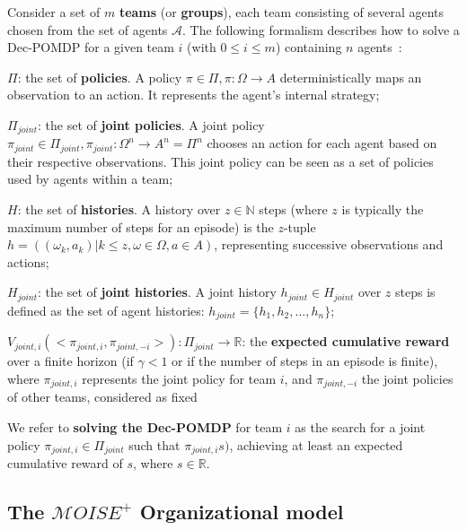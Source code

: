 \documentclass[sigconf,anonymous]{aamas}
\begin{document}
Consider a set of $m$ \textbf{teams} (or \textbf{groups}), each team consisting of several agents chosen from the set of agents $\mathcal{A}$. The following formalism describes how to solve a Dec-POMDP for a given team $i$ (with $0 \leq i \leq m$) containing $n$ agents~\citep{Beynier2013,Albrecht2024}:

\begin{itemize*}[label={},itemjoin={; \quad}]
    \item $\Pi$: the set of \textbf{policies}. A policy $\pi \in \Pi, \pi: \Omega \rightarrow A$ deterministically maps an observation to an action. It represents the agent's internal strategy;
    \item $\Pi_{joint}$: the set of \textbf{joint policies}. A joint policy $\pi_{joint} \in \Pi_{joint}, \pi_{joint}: \Omega^n \rightarrow A^n = \Pi^n$ chooses an action for each agent based on their respective observations. This joint policy can be seen as a set of policies used by agents within a team;
    \item $H$: the set of \textbf{histories}. A history over $z \in \mathbb{N}$ steps (where $z$ is typically the maximum number of steps for an episode) is the $z$-tuple $h = ((\omega_{k}, a_{k}) | k \leq z, \omega \in \Omega, a \in A)$, representing successive observations and actions;
    \item $H_{joint}$: the set of \textbf{joint histories}. A joint history $h_{joint} \in H_{joint}$ over $z$ steps is defined as the set of agent histories: $h_{joint} = \{h_1, h_2, ..., h_n\}$;
    \item $V_{joint,i}(<\pi_{joint,i}, \pi_{joint,-i}>): \Pi_{joint} \rightarrow \mathbb{R}$: the \textbf{expected cumulative reward} over a finite horizon (if $\gamma < 1$ or if the number of steps in an episode is finite), where $\pi_{joint,i}$ represents the joint policy for team $i$, and $\pi_{joint,-i}$ the joint policies of other teams, considered as fixed
\end{itemize*}

We refer to \textbf{solving the Dec-POMDP} for team $i$ as the search for a joint policy $\pi_{joint,i} \in \Pi_{joint}$ such that $\pi_{joint,i}s)$, achieving at least an expected cumulative reward of $s$, where $s \in \mathbb{R}$.



\subsection{The $\mathcal{M}OISE^+$ Organizational model}
\end{document}
